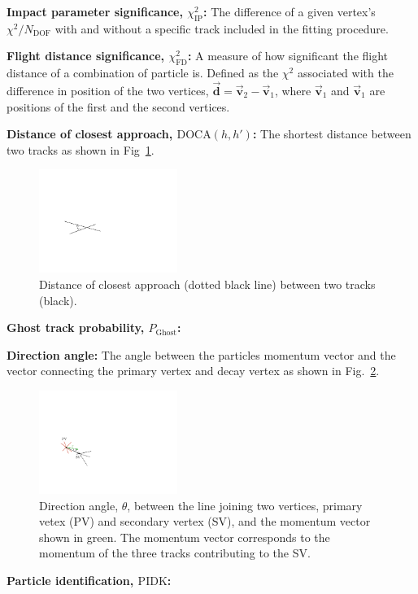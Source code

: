 \begin{description}
\item \textbf{Impact parameter significance, $\chi^{2}_{\text{IP}}$:} The difference of a given vertex's $\chi^{2}/N_{\text{DOF}}$ with and without a specific track included in the fitting procedure.
\item \textbf{Flight distance significance, $\chi^{2}_{\text{FD}}$:} A measure of how significant the flight distance of a combination of particle is. Defined as the $\chi^{2}$ associated with the difference in position of the two vertices, $\vec{\mathbf{d}} = \vec{\mathbf{v}}_2 - \vec{\mathbf{v}}_1$, where $\vec{\mathbf{v}}_1$ and $\vec{\mathbf{v}}_1$ are positions of the first and the second vertices. 
\item \textbf{Distance of closest approach, $\text{DOCA}(h,h')$:} The shortest distance between two tracks as shown in Fig~\ref{fig:doca}.
\begin{figure}[!h]
    \centering
    \includegraphics[width=0.4\textwidth]{figs/Selection/DOCA.pdf}
    \caption{Distance of closest approach (dotted black line) between two tracks (black).}
    \label{fig:doca}   
\end{figure}


\item \textbf{Ghost track probability, $P_{\text{Ghost}}$:} 
\item \textbf{Direction angle:} The angle between the particles momentum vector and the vector connecting the primary vertex and decay vertex as shown in Fig.~\ref{fig:dira}.

\begin{figure}[!h]
    \centering
    \includegraphics[width=0.4\textwidth]{figs/Selection/DIRA.pdf}
    \caption{Direction angle, $\theta$, between the line joining two vertices, primary vetex (PV) and secondary vertex (SV), and the momentum vector shown in green. The momentum vector corresponds to the momentum of the three tracks contributing to the SV. }
    \label{fig:dira}   
\end{figure}


\item \textbf{Particle identification, $\text{PIDK}$:}  
\end{description}


